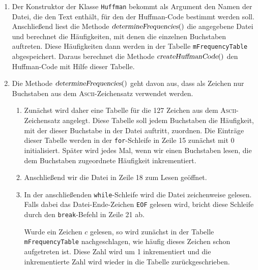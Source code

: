 \begin{enumerate}
\item Der Konstruktor der Klasse \texttt{Huffman} bekommt als Argument den Namen der Datei, die
      den Text enth\"alt, f\"ur den der Huffman-Code bestimmt werden soll.  Anschlie{\ss}end liest
      die Methode $\textsl{determineFrequencies}()$  die angegebene Datei und berechnet die H\"aufigkeiten,
      mit denen die einzelnen Buchstaben auftreten.  Diese H\"aufigkeiten dann werden in der
      Tabelle \texttt{mFrequencyTable} abgespeichert.  Daraus berechnet die Methode
      $\textsl{createHuffmanCode}()$ den Huffman-Code mit Hilfe dieser Tabelle.
\item Die Methode $\textsl{determineFrequencies}()$ geht davon aus, dass als Zeichen nur
      Buchstaben aus dem \textsc{Ascii}-Zeichensatz verwendet werden.
      \begin{enumerate}
      \item Zun\"achst wird daher eine Tabelle f\"ur die 127 Zeichen aus dem
            \textsc{Ascii}-Zeichensatz angelegt.   Diese Tabelle soll jedem 
            Buchstaben die H\"aufigkeit, mit der dieser Buchstabe in der Datei auftritt,
            zuordnen.  Die Eintr\"age dieser Tabelle werden 
            in der \texttt{for}-Schleife in Zeile 15 zun\"achst mit 0 initialisiert.
            Sp\"ater wird jedes Mal,  wenn wir einen Buchstaben lesen, die dem Buchstaben
            zugeordnete H\"aufigkeit inkrementiert.
      \item Anschlie{\ss}end wir die Datei in Zeile 18 zum Lesen ge\"offnet.
      \item In der anschlie{\ss}enden \texttt{while}-Schleife wird die Datei zeichenweise
            gelesen.  Falls dabei das Datei-Ende-Zeichen \texttt{EOF} gelesen wird,
            bricht diese Schleife durch den \texttt{break}-Befehl in Zeile 21 ab. 
            
            Wurde ein Zeichen $c$ gelesen, so wird zun\"achst in der Tabelle
            \texttt{mFrequencyTable} nachgeschlagen, wie h\"aufig dieses Zeichen schon
            aufgetreten ist.  Diese Zahl wird um 1 inkrementiert und die inkrementierte
            Zahl wird wieder in die Tabelle zur\"uckgeschrieben.
            

\end{enumerate}
\end{enumerate}
